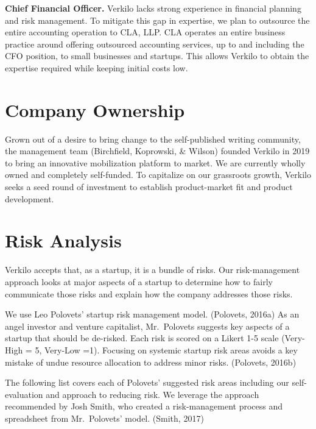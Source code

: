 \documentclass[11pt,openany]{book}
\begin{document}
\textbf{Chief Financial Officer.} Verkilo lacks strong experience in
financial planning and risk management. To mitigate this gap in
expertise, we plan to outsource the entire accounting operation to CLA,
LLP. CLA operates an entire business practice around offering outsourced
accounting services, up to and including the CFO position, to small
businesses and startups. This allows Verkilo to obtain the expertise
required while keeping initial costs low.

\hypertarget{company-ownership}{%
\section{Company Ownership}\label{company-ownership}}

Grown out of a desire to bring change to the self-published writing
community, the management team (Birchfield, Koprowski, \& Wilson)
founded Verkilo in 2019 to bring an innovative mobilization platform to
market. We are currently wholly owned and completely self-funded. To
capitalize on our grassroots growth, Verkilo seeks a seed round of
investment to establish product-market fit and product development.

\hypertarget{risk-analysis}{%
\section{Risk Analysis}\label{risk-analysis}}

Verkilo accepts that, as a startup, it is a bundle of risks. Our
risk-management approach looks at major aspects of a startup to
determine how to fairly communicate those risks and explain how the
company addresses those risks.

We use Leo Polovets' startup risk management model. (Polovets, 2016a) As
an angel investor and venture capitalist, Mr.~Polovets suggests key
aspects of a startup that should be de-risked. Each risk is scored on a
Likert 1-5 scale (Very-High = 5, Very-Low =1). Focusing on systemic
startup risk areas avoids a key mistake of undue resource allocation to
address minor risks. (Polovets, 2016b)

The following list covers each of Polovets' suggested risk areas
including our self-evaluation and approach to reducing risk. We leverage
the approach recommended by Josh Smith, who created a risk-management
process and spreadsheet from Mr.~Polovets' model. (Smith, 2017)
\end{document}
